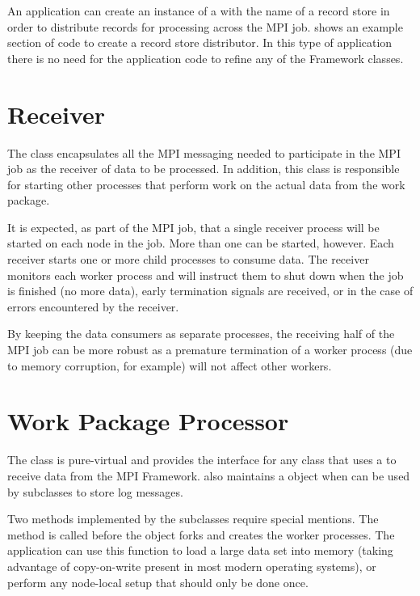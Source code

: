 An application can create an instance of a 
with the name of a record store in order to distribute records for
processing across the MPI job.  shows an
example section of code to create a record store distributor. In this
type of application there is no need for the application code to refine
any of the Framework classes.

\section{Receiver}
\label{sec-workpackagereceiver}

The  class encapsulates all the MPI messaging needed to
participate in the MPI job as the receiver of data to be processed. In
addition, this class is responsible for starting other processes that
perform work on the actual data from the work package.

It is expected, as part of the MPI job, that a single receiver process
will be started on each node in the job. More than one can be started,
however. Each receiver starts one or more child processes to
consume data. The receiver monitors each worker process and
will instruct them to shut down when the job is finished (no more data),
early termination signals are received, or in the case of errors
encountered by the receiver.

By keeping the data consumers as separate processes, the receiving half
of the MPI job can be more robust as a premature termination of a worker
process (due to memory corruption, for example) will not affect other
workers.

\section{Work Package Processor}
\label{sec-workpackageprocessor}

The  class is pure-virtual and provides the
interface for any class that uses a  to receive data from
the MPI Framework.
 also maintains a  object when
can be used by subclasses to store log messages.

Two methods implemented by the subclasses require special mentions.
The  method is called before the 
object forks and creates the worker processes. The application can use this
function to load a large data set into memory (taking advantage of copy-on-write
present in most modern operating systems), or perform any node-local setup that
should only be done once.

